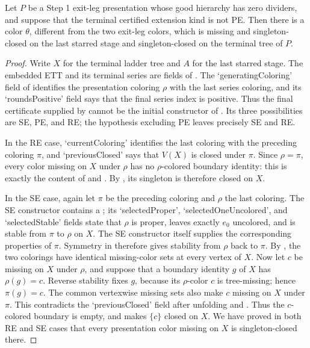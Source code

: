 \begin{lemma}
Let $P$ be a Step 1 exit-leg presentation whose good hierarchy has zero
dividers, and suppose that the terminal certified extension kind is not
PE.  Then there is a color $\theta$, different from the two exit-leg
colors, which is missing and singleton-closed on the last starred stage
and singleton-closed on the terminal tree of $P$.
\end{lemma}
\begin{proof}
Write $X$ for the terminal ladder tree and $A$ for the last starred
stage.  The embedded ETT and its terminal series are fields of
.  The `generatingColoring' field of
 identifies the presentation coloring
$\rho$ with the last series coloring, and its `roundsPositive' field
says that the final series index is positive.  Thus the final
certificate supplied by  cannot be the initial
constructor of .  Its three possibilities
are SE, PE, and RE; the hypothesis excluding PE leaves precisely SE and
RE.

In the RE case, `currentColoring' identifies the last coloring with the
preceding coloring $\pi$, and `previousClosed' says that $V(X)$ is
closed under $\pi$.  Since $\rho=\pi$, every color missing on $X$ under
$\rho$ has no $\rho$-colored boundary identity: this is exactly the
content of  and
.  By , its
singleton is therefore closed on $X$.

In the SE case, again let $\pi$ be the preceding coloring and $\rho$ the
last coloring.  The SE constructor contains a
; its `selectedProper',
`selectedOneUncolored', and `selectedStable' fields state that $\rho$ is
proper, leaves exactly $e_0$ uncolored, and is stable from $\pi$ to
$\rho$ on $X$.  The SE constructor itself supplies the corresponding
properties of $\pi$.  Symmetry in  therefore gives
stability from $\rho$ back to $\pi$.  By
, the two colorings have identical missing-color
sets at every vertex of $X$.  Now let $c$ be missing on $X$ under
$\rho$, and suppose that a boundary identity $g$ of $X$ has
$\rho(g)=c$.  Reverse stability fixes $g$, because its $\rho$-color $c$
is tree-missing; hence $\pi(g)=c$.  The common vertexwise missing sets
also make $c$ missing on $X$ under $\pi$.  This contradicts the
`previousClosed' field after unfolding
 and
.  Thus the $c$-colored boundary is empty,
and  makes $\{c\}$ closed on $X$.  We have
proved in both RE and SE cases that every presentation color missing on
$X$ is singleton-closed there.


\end{proof}

